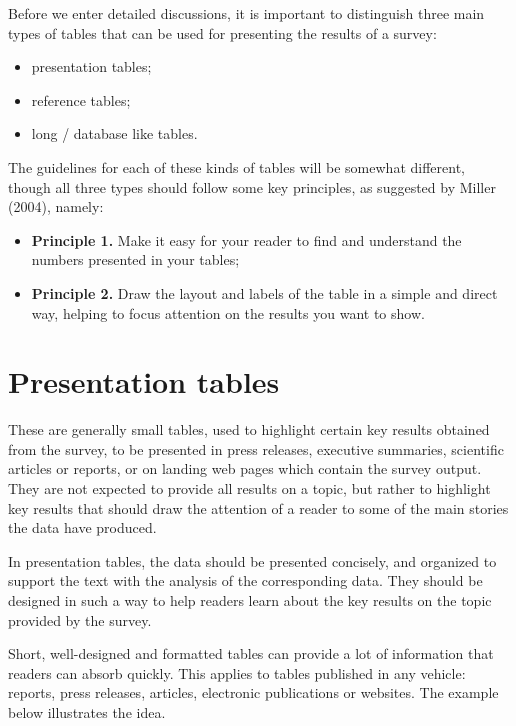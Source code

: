 \documentclass[
  12pt,
]{book}
\begin{document}
Before we enter detailed discussions, it is important to distinguish three main types of tables that can be used for presenting the results of a survey:

\begin{itemize}
\item
  presentation tables;
\item
  reference tables;
\item
  long / database like tables.
\end{itemize}

The guidelines for each of these kinds of tables will be somewhat different, though all three types should follow some key principles, as suggested by Miller (2004), namely:

\begin{itemize}
\item
  \textbf{Principle 1.} Make it easy for your reader to find and understand the numbers presented in your tables;
\item
  \textbf{Principle 2.} Draw the layout and labels of the table in a simple and direct way, helping to focus attention on the results you want to show.
\end{itemize}

\hypertarget{presentation-tables}{%
\section{Presentation tables}\label{presentation-tables}}

These are generally small tables, used to highlight certain key results obtained from the survey, to be presented in press releases, executive summaries, scientific articles or reports, or on landing web pages which contain the survey output. They are not expected to provide all results on a topic, but rather to highlight key results that should draw the attention of a reader to some of the main stories the data have produced.

In presentation tables, the data should be presented concisely, and organized to support the text with the analysis of the corresponding data. They should be designed in such a way to help readers learn about the key results on the topic provided by the survey.

Short, well-designed and formatted tables can provide a lot of information that readers can absorb quickly. This applies to tables published in any vehicle: reports, press releases, articles, electronic publications or websites. The example below illustrates the idea.
\end{document}
